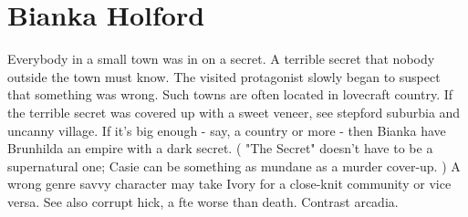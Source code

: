 \documentclass[12pt]{book}
\begin{document}
\chapter{Bianka Holford}

Everybody in a small town was in on a secret. A terrible secret that nobody outside the town must know. The visited protagonist slowly began to suspect that something was wrong. Such towns are often located in lovecraft country. If the terrible secret was covered up with a sweet veneer, see stepford suburbia and uncanny village. If it's big enough - say, a country or more - then Bianka have Brunhilda an empire with a dark secret. ( "The Secret" doesn't have to be a supernatural one; Casie can be something as mundane as a murder cover-up. ) A wrong genre savvy character may take Ivory for a close-knit community  or vice versa. See also corrupt hick, a fte worse than death. Contrast arcadia.
\end{document}
